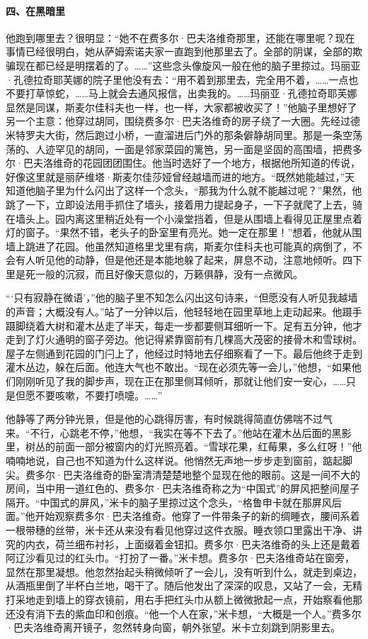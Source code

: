 \paragraph*{四、在黑暗里}
\par 他跑到哪里去？很明显：“她不在费多尔·巴夫洛维奇那里，还能在哪里呢？现在事情已经很明白，她从萨姆索诺夫家一直跑到他那里去了。全部的阴谋，全部的欺骗现在都已经是明摆着的了。……”这些念头像旋风一般在他的脑子里掠过。玛丽亚·孔德拉奇耶芙娜的院子里他没有去：“用不着到那里去，完全用不着，……一点也不要打草惊蛇，……马上就会去通风报信，出卖我的。……玛丽亚·孔德拉奇耶芙娜显然是同谋，斯麦尔佳科夫也一样，也一样，大家都被收买了！”他脑子里想好了另一个主意：他穿过胡同，围绕费多尔·巴夫洛维奇的房子绕了一大圈。先经过德米特罗夫大街，然后跑过小桥，一直溜进后门外的那条僻静胡同里。那是一条空荡荡的、人迹罕见的胡同，一面是邻家菜园的篱笆，另一面是坚固的高围墙，把费多尔·巴夫洛维奇的花园团团围住。他当时选好了一个地方，根据他所知道的传说，好像这里就是丽萨维塔·斯麦尔佳莎娅曾经越墙而进的地方。“既然她能越过，”天知道他脑子里为什么闪出了这样一个念头，“那我为什么就不能越过呢？”果然，他跳了一下，立即设法用手抓住了墙头，接着用力提起身子，一下子就爬了上去，骑在墙头上。园内离这里稍近处有一个小澡堂挡着，但是从围墙上看得见正屋里点着灯的窗子。“果然不错，老头子的卧室里有亮光。她一定在那里！”想着，他就从围墙上跳进了花园。他虽然知道格里戈里有病，斯麦尔佳科夫也可能真的病倒了，不会有人听见他的动静，但是他还是本能地躲了起来，屏息不动，注意地倾听。四下里是死一般的沉寂，而且好像天意似的，万籁俱静，没有一点微风。
\par “‘只有寂静在微语’，”他的脑子里不知怎么闪出这句诗来，“但愿没有人听见我越墙的声音；大概没有人。”站了一分钟以后，他轻轻地在园里草地上走动起来。他蹑手蹑脚绕着大树和灌木丛走了半天，每走一步都要侧耳细听一下。足有五分钟，他才走到了灯火通明的窗子旁边。他记得紧靠窗前有几棵高大茂密的接骨木和雪球树。屋子左侧通到花园的门闩上了，他经过时特地去仔细察看了一下。最后他终于走到灌木丛边，躲在后面。他连大气也不敢出。“现在必须先等一会儿，”他想，“如果他们刚刚听见了我的脚步声，现在正在那里侧耳倾听，那就让他们安一安心，……只是但愿不要咳嗽，不要打喷嚏。……”
\par 他静等了两分钟光景，但是他的心跳得厉害，有时候跳得简直仿佛喘不过气来。“不行，心跳老不停，”他想，“我实在等不下去了。”他站在灌木丛后面的黑影里，树丛的前面一部分被窗内的灯光照亮着。“雪球花果，红莓果，多么红呀！”他喃喃地说，自己也不知道为什么这样说。他悄然无声地一步步走到窗前，踮起脚尖。费多尔·巴夫洛维奇的卧室清清楚楚地整个显现在他的眼前。这是一间不大的房间，当中用一道红色的、费多尔·巴夫洛维奇称之为“中国式”的屏风把整间屋子隔开。“中国式的屏风，”米卡的脑子里掠过这个念头，“格鲁申卡就在那屏风后面。”他开始观察费多尔·巴夫洛维奇。他穿了一件带条子的新的绸睡衣，腰间系着一根带穗的丝带，米卡还从来没有看见他穿过这件衣服。睡衣领口里露出干净、讲究的内衣，荷兰细布衬衫，上面缀着金钮扣。费多尔·巴夫洛维奇的头上还是戴着阿辽沙看见过的红头巾。“打扮了一番。”米卡想。费多尔·巴夫洛维奇站在窗旁，显然在那里凝想。他忽然抬起头稍微倾听了一会儿，没有听到什么，就走到桌边，从酒瓶里倒了半杯白兰地，喝干了。随后他发出了深深的叹息，又站了一会，无精打采地走到墙上的穿衣镜前，用右手把红头巾从额上微微掀起一点，开始察看他那还没有消下去的紫血印和创痕。“他一个人在家，”米卡想，“大概是一个人。”费多尔·巴夫洛维奇离开镜子，忽然转身向窗，朝外张望。米卡立刻跳到阴影里去。
